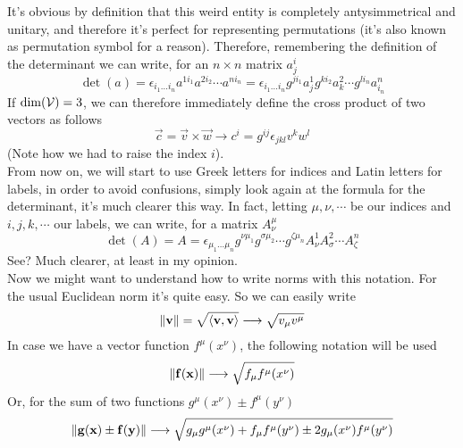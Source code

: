 \documentclass[../complete.tex]{subfiles}
\begin{document}
It's obvious by definition that this weird entity is completely antysimmetrical and unitary, and therefore it's perfect for representing permutations (it's also known as permutation symbol for a reason). Therefore, remembering the definition of the determinant we can write, for an $n\times n$ matrix $a^i_j$
\begin{equation}
	\det(a)=\epsilon_{i_1\ldots i_n}a^{1i_1}a^{2i_2}\cdots a^{ni_n}=\epsilon_{i_1\ldots i_n}g^{ji_1}a^1_{j}g^{ki_2}a^2_{k}\cdots g^{li_n}a^n_{i_n}
	\label{eq:determinanteinnot}
\end{equation}
If $\dim(\mathcal{V})=3$, we can therefore immediately define the cross product of two vectors as follows
\begin{equation}
	\vec{c}=\vec{v}\times\vec{w}\longrightarrow c^i=g^{ij}\epsilon_{jkl}v^kw^l
	\label{eq:crossproducteinst}
\end{equation}
(Note how we had to raise the index $i$).\\
From now on, we will start to use Greek letters for indices and Latin letters for labels, in order to avoid confusions, simply look again at the formula for the determinant, it's much clearer this way. In fact, letting $\mu,\nu,\cdots$ be our indices and $i,j,k,\cdots$ our labels, we can write, for a matrix $A^\mu_\nu$
\begin{equation}
	\det(A)=A=\epsilon_{\mu_1\ldots \mu_n}g^{\nu\mu_1}g^{\sigma\mu_2}\cdots g^{\zeta\mu_{n}}A^1_{\nu}A^2_\sigma\cdots A^n_\zeta
	\label{eq:greekdeterminant}
\end{equation}
See? Much clearer, at least in my opinion.\\
Now we might want to understand how to write norms with this notation. For the usual Euclidean norm it's quite easy. So we can easily write
\begin{equation}
	\norm{\mathbf{v}}=\sqrt{\langle \mathbf{v}, \mathbf{v} \rangle}\overset{}{\longrightarrow}\sqrt{v_\mu v^\mu}
	\label{eq:2normein}
\end{equation}
In case we have a vector function $f^\mu(x^\nu)$, the following notation will be used
\begin{equation}
	\norm{\mathbf{f}(\mathbf{x})}\overset{}{\longrightarrow} \sqrt{f_\mu f^\mu(x^\nu)}
	\label{eq:fnormein}
\end{equation}
Or, for the sum of two functions $g^\mu(x^\nu)\pm f^\mu(y^\nu)$
\begin{equation}
	\norm{\mathbf{g}(\mathbf{x})\pm\mathbf{f}(\mathbf{y})}\longrightarrow\sqrt{g_\mu g^\mu(x^\nu)+f_\mu f^\mu(y^\nu)\pm2g_\mu(x^\nu)f^\mu(y^\nu)}	\label{eq:funcsumein}
\end{equation}
\end{document}
